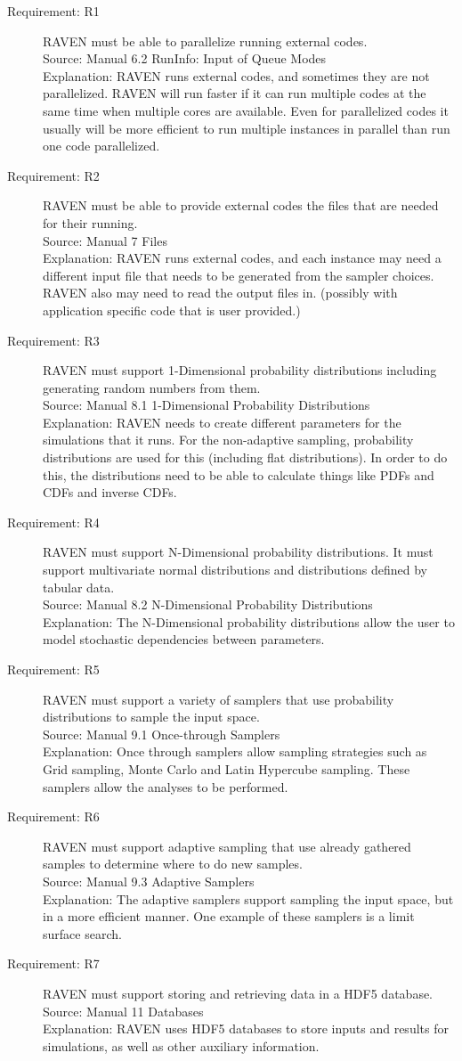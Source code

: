 \documentclass{article}
\newcommand{\requirement}[4]{\item[Requirement: #1] #2 \\Source: #3\\Explanation: #4}
\begin{document}
\begin{description}
\requirement{R1}{RAVEN must be able to parallelize running external codes.}
{Manual 6.2 RunInfo: Input of Queue Modes}
{RAVEN runs external codes, and sometimes they are not parallelized.  RAVEN will run faster if it can run multiple codes at the same time when multiple cores are available.  Even for parallelized codes it usually will be more efficient to run multiple instances in parallel than run one code parallelized.}

\requirement{R2}{RAVEN must be able to provide external codes the files that are needed for their running.}
{Manual 7 Files}
{RAVEN runs external codes, and each instance may need a different input file that needs to be generated from the sampler choices.  RAVEN also may need to read the output files in. (possibly with application specific code that is user provided.)}

\requirement{R3}{RAVEN must support 1-Dimensional probability distributions including generating random numbers from them.}
{Manual 8.1 1-Dimensional Probability Distributions}
{RAVEN needs to create different parameters for the simulations that it runs.  For the non-adaptive sampling, probability distributions are used for this (including flat distributions).  In order to do this, the distributions need to be able to calculate things like PDFs and CDFs and inverse CDFs.}

\requirement{R4}{RAVEN must support N-Dimensional probability distributions.  It must support multivariate normal distributions and distributions defined by tabular data.}
{Manual 8.2 N-Dimensional Probability Distributions}
{The N-Dimensional probability distributions allow the user to model stochastic dependencies between parameters.}

\requirement{R5}{RAVEN must support a variety of samplers that use probability distributions to sample the input space.}
{Manual 9.1 Once-through Samplers}
{Once through samplers allow sampling strategies such as Grid sampling, Monte Carlo and Latin Hypercube sampling.  These samplers allow the analyses to be performed.}

\requirement{R6}{RAVEN must support adaptive sampling that use already gathered samples to determine where to do new samples.}
{Manual 9.3 Adaptive Samplers}
{The adaptive samplers support sampling the input space, but in a more efficient manner.  One example of these samplers is a limit surface search.}

\requirement{R7}{RAVEN must support storing and retrieving data in a HDF5 database.}
{Manual 11 Databases}
{RAVEN uses HDF5 databases to store inputs and results for simulations, as well as other auxiliary information.}


\end{description}
\end{document}
